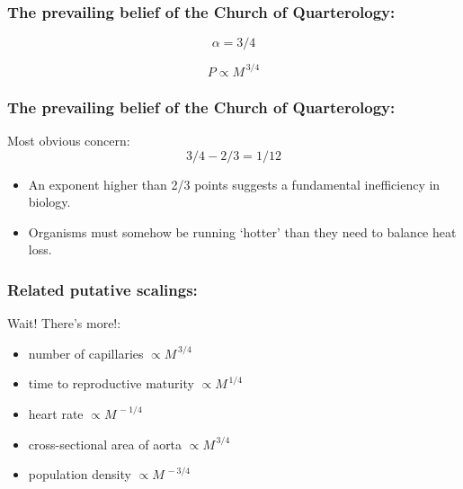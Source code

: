\begin{frame}
  \frametitle{The prevailing belief of the Church of Quarterology:}

  \bigskip

  \begin{block}{}
  $$ \boxed{\alpha = 3/4} $$

  \bigskip

  $$ P \propto M^{\, 3/4} $$

  \bigskip

  \begin{center}
  \end{center}
  \end{block}

\end{frame}


\begin{frame}
  \frametitle{The prevailing belief of the Church of Quarterology:}


  \begin{block}{Most obvious concern:}
    $$
    3/4 - 2/3 = 1/12
    $$
    \begin{itemize}
    \item<+->
      An exponent higher than 2/3 points suggests
      a fundamental inefficiency in biology.
    \item<+->
      Organisms must somehow be running `hotter' than
      they need to balance heat loss.
    \end{itemize}
  \end{block}

\end{frame}

\begin{frame}
  \frametitle{Related putative scalings:}

  \begin{block}{Wait! There's more!:}
  \begin{itemize}
  \item 
  number of capillaries $\propto M^{\, 3/4}$
  \item 
  time to reproductive maturity $\propto M^{\, 1/4}$
  \item 
  heart rate $\propto M^{\, -1/4}$
  \item 
  cross-sectional area of aorta $\propto M^{\, 3/4}$
  \item 
  population density $\propto M^{\, -3/4}$
  \end{itemize}
  \end{block}

\end{frame}


